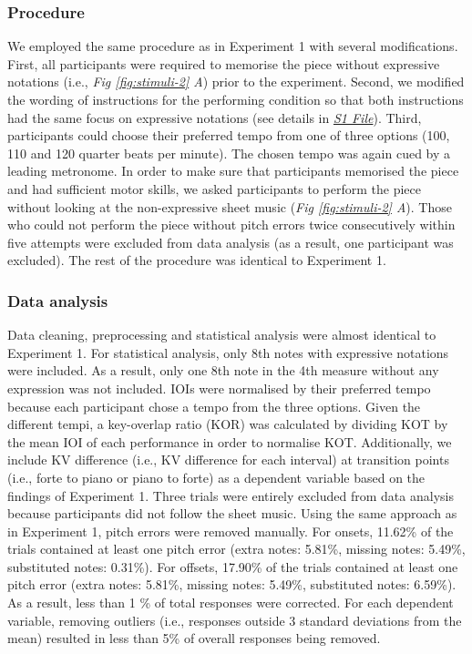 \documentclass[
  english,
  man,floatsintext]{apa6}
\begin{document}
\hypertarget{procedure-2}{%
\subsubsection{Procedure}\label{procedure-2}}

We employed the same procedure as in Experiment 1 with several modifications. First, all participants were required to memorise the piece without expressive notations (i.e., \emph{Fig \ref{fig:stimuli-2} A}) prior to the experiment. Second, we modified the wording of instructions for the performing condition so that both instructions had the same focus on expressive notations (see details in \emph{\protect\hyperlink{supplemental}{S1 File}}). Third, participants could choose their preferred tempo from one of three options (100, 110 and 120 quarter beats per minute). The chosen tempo was again cued by a leading metronome. In order to make sure that participants memorised the piece and had sufficient motor skills, we asked participants to perform the piece without looking at the non-expressive sheet music (\emph{Fig \ref{fig:stimuli-2} A}). Those who could not perform the piece without pitch errors twice consecutively within five attempts were excluded from data analysis (as a result, one participant was excluded). The rest of the procedure was identical to Experiment 1.

\hypertarget{data-analysis-1}{%
\subsubsection{Data analysis}\label{data-analysis-1}}

Data cleaning, preprocessing and statistical analysis were almost identical to Experiment 1. For statistical analysis, only 8th notes with expressive notations were included. As a result, only one 8th note in the 4th measure without any expression was not included. IOIs were normalised by their preferred tempo because each participant chose a tempo from the three options. Given the different tempi, a key-overlap ratio (KOR) was calculated by dividing KOT by the mean IOI of each performance in order to normalise KOT. Additionally, we include KV difference (i.e., KV difference for each interval) at transition points (i.e., forte to piano or piano to forte) as a dependent variable based on the findings of Experiment 1. Three trials were entirely excluded from data analysis because participants did not follow the sheet music. Using the same approach as in Experiment 1, pitch errors were removed manually. For onsets, 11.62\% of the trials contained at least one pitch error (extra notes: 5.81\%, missing notes: 5.49\%, substituted notes: 0.31\%). For offsets, 17.90\% of the trials contained at least one pitch error (extra notes: 5.81\%, missing notes: 5.49\%, substituted notes: 6.59\%). As a result, less than 1 \% of total responses were corrected. For each dependent variable, removing outliers (i.e., responses outside 3 standard deviations from the mean) resulted in less than 5\% of overall responses being removed.
\end{document}
